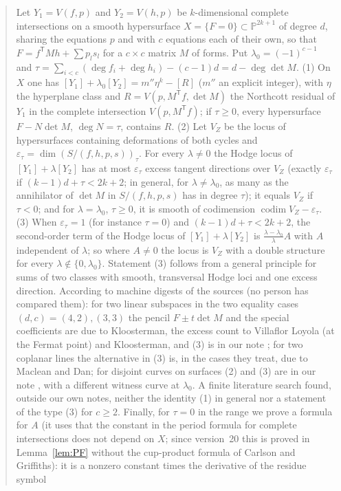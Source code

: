 \documentclass[11pt]{article}
\numberwithin{equation}{section}
\theoremstyle{remark}
\newcommand{\PP}{\mathbb{P}}
\newcommand{\VZ}{V_Z}
\newcommand{\codim}{\operatorname{codim}}
\newcommand{\T}{\mathsf{T}}
\newcommand{\lz}{\lambda_0}
\newcommand{\et}{\varepsilon_\tau}
\begin{document}
\begin{abstract}
Let $Y_1=V(f,p)$ and $Y_2=V(h,p)$ be $k$-dimensional complete intersections on a smooth hypersurface
$X=\{F=0\}\subset\PP^{2k+1}$ of degree $d$, sharing the equations $p$ and with $c$ equations each of their own, so
that $F=f^\T Mh+\sum p_ls_l$ for a $c\times c$ matrix $M$ of forms. Put $\lz=(-1)^{c-1}$ and
$\tau=\sum_{i<c}(\deg f_i+\deg h_i)-(c-1)d=d-\deg\det M$. (1) On $X$ one has
$[Y_1]+\lz[Y_2]=m''\eta^k-[R]$ ($m''$ an explicit integer), with $\eta$ the hyperplane class and $R=V(p,M^\T f,\det M)$ the Northcott residual
of $Y_1$ in the complete intersection $V(p,M^\T f)$; if $\tau\ge0$, every hypersurface $F-N\det M$,
$\deg N=\tau$, contains $R$. (2) Let $\VZ$ be the locus of hypersurfaces containing deformations of both cycles
and $\et=\dim(S/(f,h,p,s))_\tau$. For every $\lambda\ne0$ the Hodge locus of $[Y_1]+\lambda[Y_2]$ has at most
$\et$ excess tangent directions over $\VZ$ (exactly $\et$ if $(k-1)d+\tau<2k+2$; in general, for
$\lambda\ne\lz$, as many as the annihilator of $\det M$ in $S/(f,h,p,s)$ has in degree $\tau$); it equals $\VZ$ if
$\tau<0$; and for $\lambda=\lz$, $\tau\ge0$, it is smooth of codimension $\codim\VZ-\et$. (3) When $\et=1$ (for instance
$\tau=0$) and $(k-1)d+\tau<2k+2$, the second-order term of the Hodge locus of $[Y_1]+\lambda[Y_2]$ is
$\frac{\lambda-\lz}{\lambda}A$ with $A$ independent of $\lambda$; so where $A\ne0$ the locus is $\VZ$ with a double
structure for every $\lambda\notin\{0,\lz\}$. Statement (3) follows from a general principle for sums of two
classes with smooth, transversal Hodge loci and one excess direction. According to machine digests of the sources (no person has compared them): for two linear subspaces in the
two equality cases $(d,c)=(4,2),(3,3)$ the pencil $F\pm t\det M$ and the special coefficients are due to
Kloosterman, the excess count to Villaflor Loyola (at the Fermat point) and Kloosterman, and (3) is in our
note \cite{P1}; for two coplanar lines the alternative in (3) is, in the cases they treat, due to Maclean and
Dan; for disjoint curves on surfaces (2) and (3) are in our note \cite{P2}, with a different witness
curve at $\lz$. A finite literature search found, outside our own notes, neither the identity (1) in general
nor a statement of the type (3) for $c\ge2$. Finally, for $\tau=0$ in the range we prove a formula for $A$ (it uses that the constant in the period
formula for complete intersections does not depend on $X$; since version~20 this is proved in
Lemma~\ref{lem:PF} without the cup-product formula of Carlson and Griffiths): it is a nonzero constant times the derivative of the residue symbol

\end{abstract}
\end{document}
